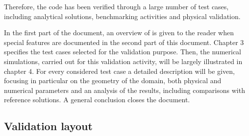 Therefore, the \estel code has been verified through a large number of test cases,
including analytical solutions, benchmarking activities and physical validation.

In the first part of the document, an overview of \estel is given to the reader
when \estel special features are documented in the second part of this document.
Chapter 3 specifies the test cases selected for the \estel validation purpose.
Then, the numerical simulations, carried out for this validation activity, will be largely illustrated in chapter 4.
For every considered test case a detailed description will be given,
focusing in particular on the geometry of the domain, both physical and numerical parameters
and an analysis of the results, including comparisons with reference solutions.
A general conclusion closes the document.

\subsection{Validation layout}

